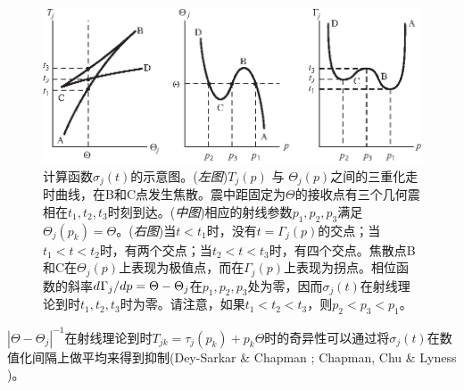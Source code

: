 \begin{figure}[!t]
\begin{center}
\includegraphics{../figures/chap12/fig27.eps}
\end{center}
\caption[AkiRichardsFig9.21]{\label{12.fig.chapman}
计算函数$\sigma_j(t)$的示意图。({\em 左图\/})$T_j(p)$ 与 $\Theta_j(p)$之间的三重化走时曲线，在B和C点发生焦散。震中距固定为$\Theta$的接收点有三个几何震相在$t_1,t_2,t_3$时刻到达。({\em 中图\/})相应的射线参数$p_1,p_2,p_3$满足$\Theta_j(p_k)=\Theta$。({\em 右图\/})当$t<t_1$时，没有$t=\Gamma_j(p)$的交点；当$t_1<t<t_2$时，有两个交点；当$t_2<t<t_3$时，有四个交点。焦散点B和C在$\Theta_j(p)$上表现为极值点，而在$\Gamma_j(p)$上表现为拐点。相位函数的斜率$d\hspace{0.1 ex}\Gamma_j/dp=\Theta-\Theta_j$在$p_1,p_2,p_3$处为零，因而$\sigma_j(t)$在射线理论到时$t_1,t_2,t_3$时为零。请注意，如果$t_1<t_2<t_3$，则$p_2<p_3<p_1$。
}
\end{figure}
$|\Theta-\Theta_j|^{-1}$在射线理论到时$T_{jk}=\tau_j(p_k)+p_k\Theta$时的奇异性可以通过将$\sigma_j(t)$在数值化间隔上做平均来得到抑制(Dey-Sarkar \& Chapman \citeyear{dey-sarkar&chapman78};
Chapman, Chu \& Lyness \citeyear{chapman&al88})。

